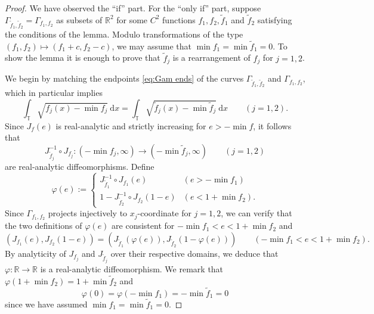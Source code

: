 \documentclass[11pt,letterpaper,oneside]{amsart}
\newcommand{\R}{\mathbb{R}}
\newcommand{\T}{\mathbb{T}}
\theoremstyle{definition}
\theoremstyle{remark}
\newcommand{\inv}{^{-1}}
\newcommand{\wt}{\widetilde}
\theoremstyle{definition}
\theoremstyle{remark}
\newcommand{\dif}{\mathrm{d}}
\begin{document}
\begin{proof}
	We have observed the ``if'' part. 
	For the ``only if'' part, suppose $\Gamma_{\wt f_1, \wt f_2} = \Gamma_{f_1, f_2}$ as subsets of $\R^2$ for some $C^2$ functions $f_1, f_2, \wt f_1$ and $\wt f_2$ satisfying the conditions of the lemma.
	Modulo transformations of the type $(f_1, f_2) \mapsto (f_1 + c, f_2 - c)$, we may assume that $\min f_1 = \min \wt f_1 = 0$.
	To show the lemma it is enough to prove that $\wt f_j$ is a rearrangement of $f_j$ for $j = 1,2$.

\medskip

    We begin by matching the endpoints \eqref{eq:Gam ends} of the curves $\Gamma_{\wt f_1, \wt f_2}$ and $\Gamma_{f_1, f_2}$, which in particular implies
    \begin{equation*}        \int_{\T} \sqrt{f_j(x) - \min f_j}\ \dif x = 
        \int_{\T} \sqrt{\wt f_j(x) - \min \wt f_j}\ \dif x \qquad (j = 1,2).
    \end{equation*}
	Since $J_f(e)$ is real-analytic and strictly increasing for $e > -\min f$, it follows that 
    \begin{equation*}        J_{\wt f_j}\inv \circ J_{f_j} : (-\min f_j, \infty) \to  (-\min \wt f_j, \infty) \qquad (j = 1,2)
    \end{equation*}
    are real-analytic diffeomorphisms.
    Define 
    \begin{equation*}    \varphi(e) :=  \begin{cases}
            J_{\wt f_1}\inv \circ J_{f_1} (e) & (e > -\min f_1) \\
            1 - J_{\wt f_2}\inv \circ J_{f_2} (1 - e)  & (e < 1 + \min f_2).
        \end{cases}
    \end{equation*}
    Since $\Gamma_{f_1, f_2}$ projects injectively to $x_j$-coordinate for $j = 1,2$, we can verify that the two definitions of $\varphi(e)$ are consistent for $-\min f_1 < e < 1 + \min f_2$ and
    \begin{equation}\label{eq:J reparam}
        (J_{f_1}(e), J_{f_2}(1- e)) = (J_{\wt f_1}(\varphi(e)), J_{\wt f_2}(1- \varphi(e))) \qquad  (-\min f_1 < e < 1 + \min f_2).
    \end{equation}
    By analyticity of $J_{f_j}$ and $J_{\wt f_j}$ over their respective domains, we deduce that $\varphi: \R \to \R$ is a real-analytic diffeomorphism.
    We remark that $\varphi(1 + \min f_2) = 1 + \min \wt f_2$ and 
    \begin{equation*}    
        \varphi(0) = \varphi(-\min f_1) = - \min \wt f_1 = 0
    \end{equation*} 
 since we have assumed $\min f_1 = \min \wt f_1 = 0$.


\end{proof}
\end{document}
